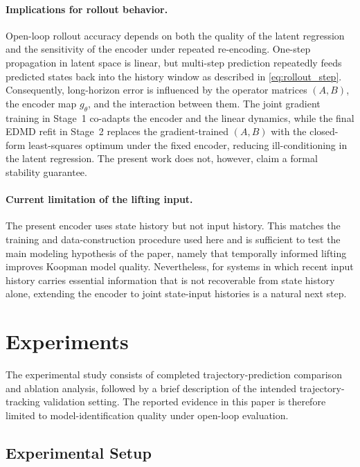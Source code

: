\documentclass[journal]{IEEEtran}
\begin{document}
\paragraph{Implications for rollout behavior.}
Open-loop rollout accuracy depends on both the quality of the latent regression and the sensitivity of the encoder under repeated re-encoding. One-step propagation in latent space is linear, but multi-step prediction repeatedly feeds predicted states back into the history window as described in \eqref{eq:rollout_step}. Consequently, long-horizon error is influenced by the operator matrices $(A,B)$, the encoder map $g_\theta$, and the interaction between them. The joint gradient training in Stage~1 co-adapts the encoder and the linear dynamics, while the final EDMD refit in Stage~2 replaces the gradient-trained $(A,B)$ with the closed-form least-squares optimum under the fixed encoder, reducing ill-conditioning in the latent regression. The present work does not, however, claim a formal stability guarantee.

\paragraph{Current limitation of the lifting input.}
The present encoder uses state history but not input history. This matches the training and data-construction procedure used here and is sufficient to test the main modeling hypothesis of the paper, namely that temporally informed lifting improves Koopman model quality. Nevertheless, for systems in which recent input history carries essential information that is not recoverable from state history alone, extending the encoder to joint state-input histories is a natural next step.

\section{Experiments}
\label{sec:experiments}

The experimental study consists of completed trajectory-prediction comparison and ablation analysis, followed by a brief description of the intended trajectory-tracking validation setting. The reported evidence in this paper is therefore limited to model-identification quality under open-loop evaluation.

\subsection{Experimental Setup}
\end{document}

